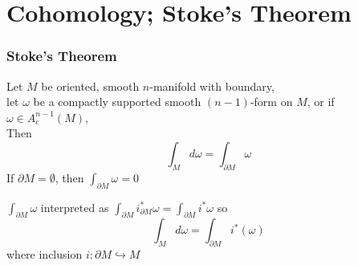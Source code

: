 \part{Cohomology; Stoke's Theorem}


\section{Stoke's Theorem}

\begin{theorem}
	Let $M$ be oriented, smooth $n$-manifold with boundary, \\
	let $\omega$ be a compactly supported smooth $(n-1)$-form on $M$, or if $\omega \in A_c^{n-1}(M)$, \\
	Then
	\begin{equation}
	\int_M d\omega = \int_{\partial M} \omega
	\end{equation} 
	If $\partial M = \emptyset$, then $\int_{\partial M} \omega = 0$
	
	$\int_{\partial M} \omega$ interpreted as $\int_{\partial M} i^*_{\partial M} \omega = \int_{\partial M} i^*\omega$ so 
	\begin{equation}
	\int_M d\omega = \int_{\partial M} i^*(\omega)
	\end{equation}
	where inclusion $i: \partial M \hookrightarrow M$
\end{theorem}

